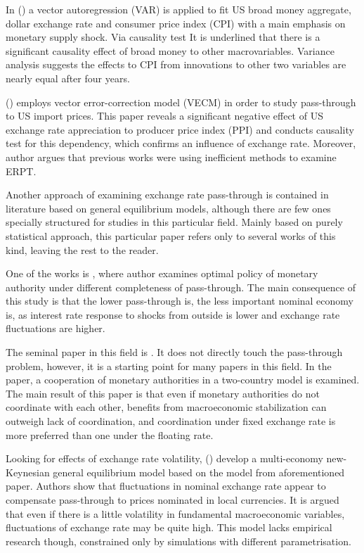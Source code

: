\documentclass[12pt, a4paper]{extarticle}
\begin{document}
In (\cite{Deravi1995}) a vector autoregression (VAR) is applied to fit US broad money aggregate, dollar exchange rate and consumer price index (CPI) with a main emphasis on monetary supply shock. Via causality test It is underlined that there is a significant causality effect of broad money to other macrovariables. Variance analysis suggests the effects to CPI from innovations to other two variables are nearly equal after four years.
 
(\cite{Kim1998}) employs vector error-correction model (VECM) in order to study pass-through to US import prices. This paper reveals a significant negative effect of US exchange rate appreciation to producer price index (PPI) and conducts causality test for this dependency, which confirms an influence of exchange rate. Moreover, author argues that previous works were using inefficient methods to examine ERPT. 
 
Another approach of examining exchange rate pass-through is contained in literature based on general equilibrium models, although there are few ones specially structured for studies in this particular field. Mainly based on purely statistical approach, this particular paper refers only to several works of this kind, leaving the rest to the reader.

One of the works is \cite{Adolfson2001}, where author examines optimal policy of monetary authority under different completeness of pass-through. The main consequence of this study is that the lower pass-through is, the less important nominal economy is, as interest rate response to shocks from outside is lower and exchange rate fluctuations are higher.

The seminal paper in this field is \cite{Obstfeld2002}. It does not directly touch the pass-through problem, however, it is a starting point for many papers in this field. In the paper, a cooperation of monetary authorities in a two-country model is examined. The main result of this paper is that even if monetary authorities do not coordinate with each other, benefits from macroeconomic stabilization can outweigh lack of coordination, and coordination under fixed exchange rate is more preferred than one under the floating rate.

Looking for effects of exchange rate volatility, (\cite{Devereux2002}) develop a multi-economy new-Keynesian general equilibrium model based on the model from aforementioned paper. Authors show that fluctuations in nominal exchange rate appear to compensate pass-through to prices nominated in local currencies. It is argued that even if there is a little volatility in fundamental macroeconomic variables, fluctuations of exchange rate may be quite high. This model lacks empirical research though, constrained only by simulations with different parametrisation.
\end{document}
